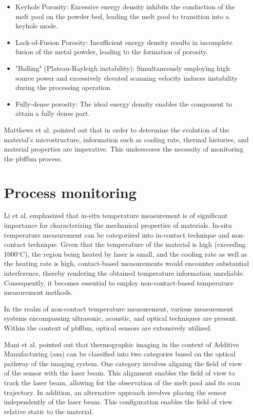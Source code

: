 \begin{itemize}
    \item Keyhole Porosity: Excessive energy density inhibits the conduction 
    of the melt pool on the powder bed, leading the melt pool to transition 
    into a keyhole mode.
    \item Lack-of-Fusion Porosity: Insufficient energy density results in 
    incomplete fusion of the metal powder, leading to the formation of 
    porosity.
    \item "Balling" (Plateau-Rayleigh instability): Simultaneously employing 
    high source power and excessively elevated scanning velocity induces 
    instability during the processing operation.
    \item Fully-dense porosity: The ideal energy density enables the 
    component to attain a fully dense part.
\end{itemize}


Matthews et al. \cite{Matthews.2017} pointed out that in order to determine 
the evolution of the material's microstructure, information such as 
cooling rate, thermal histories, and material properties are imperative. 
This underscores the necessity of monitoring the \gls{pbflbm} process.

\section{Process monitoring}%
Li et al. \cite{Li.2019} emphasized that in-situ temperature measurement is 
of significant importance for characterizing the mechanical properties of 
materials. In-situ temperature measurement can be categorized into 
in-contact technique and non-contact technique. Given that the temperature 
of the material is high (exceeding 1000$^\circ$C), the region being heated by laser 
is small, and the cooling rate as well as the heating rate is high, 
contact-based measurements would encounter substantial interference, 
thereby rendering the obtained temperature information unreliable. 
Consequently, it becomes essential to employ non-contact-based 
temperature measurement methods.


In the realm of non-contact temperature measurement, 
various measurement systems encompassing ultrasonic, acoustic, and optical 
techniques are present. Within the context of \gls{pbflbm}, 
optical sensors are extensively utilized\cite{Krauss.2012}.


Mani et al. \cite{Mani.2017} pointed out that thermographic imaging in the 
context of Additive Manufacturing (\gls{am}) can be classified into two 
categories based on the optical pathway of the imaging system. 
One category involves aligning the field of view of the sensor with 
the laser beam\cite{Craeghs.2010b,Craeghs.2012,Chivel.2010,Bammer.2010,Berumen.2010,Lott.2011,Yadroitsev.2014}. 
This alignment enables the field of view to track the laser beam, 
allowing for the observation of the melt pool and its scan trajectory.
In addition, an alternative approach involves placing the sensor 
independently of the laser beam. This configuration enables the 
field of view relative static to the material\cite{Craeghs.2012,Dinwiddie.2014,Price.2012,Price.2013,Rodriguez.2012,Wegner.2011}.


